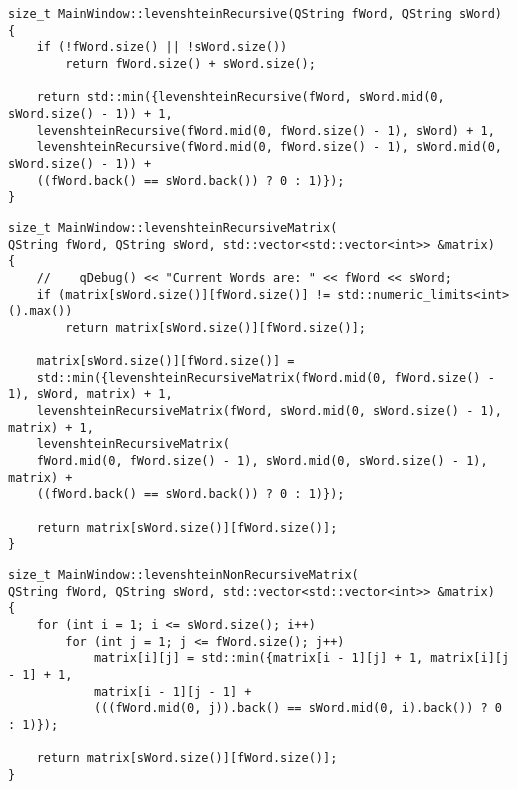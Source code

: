 \documentclass[12pt]{report}
\begin{document}
\begin{lstlisting}[label=some-code,caption=Функция реализации рекурсивного алгоритма Левенштейна]
size_t MainWindow::levenshteinRecursive(QString fWord, QString sWord)
{
    if (!fWord.size() || !sWord.size())
        return fWord.size() + sWord.size();

    return std::min({levenshteinRecursive(fWord, sWord.mid(0, sWord.size() - 1)) + 1,
    levenshteinRecursive(fWord.mid(0, fWord.size() - 1), sWord) + 1,
    levenshteinRecursive(fWord.mid(0, fWord.size() - 1), sWord.mid(0, sWord.size() - 1)) +
    ((fWord.back() == sWord.back()) ? 0 : 1)});
}
\end{lstlisting}

\begin{lstlisting}[label=some-code,caption=Функция реализации рекурсивного алгоритма Левенштейна с использованием матрицы расстояний]
size_t MainWindow::levenshteinRecursiveMatrix(
QString fWord, QString sWord, std::vector<std::vector<int>> &matrix)
{
    //    qDebug() << "Current Words are: " << fWord << sWord;
    if (matrix[sWord.size()][fWord.size()] != std::numeric_limits<int>().max())
        return matrix[sWord.size()][fWord.size()];

    matrix[sWord.size()][fWord.size()] =
    std::min({levenshteinRecursiveMatrix(fWord.mid(0, fWord.size() - 1), sWord, matrix) + 1,
    levenshteinRecursiveMatrix(fWord, sWord.mid(0, sWord.size() - 1), matrix) + 1,
    levenshteinRecursiveMatrix(
    fWord.mid(0, fWord.size() - 1), sWord.mid(0, sWord.size() - 1), matrix) +
    ((fWord.back() == sWord.back()) ? 0 : 1)});

    return matrix[sWord.size()][fWord.size()];
}
\end{lstlisting}

\begin{lstlisting}[label=some-code,caption=Функция реализации итеративного алгоритма Левенштейна]
size_t MainWindow::levenshteinNonRecursiveMatrix(
QString fWord, QString sWord, std::vector<std::vector<int>> &matrix)
{
    for (int i = 1; i <= sWord.size(); i++)
        for (int j = 1; j <= fWord.size(); j++)
            matrix[i][j] = std::min({matrix[i - 1][j] + 1, matrix[i][j - 1] + 1,
            matrix[i - 1][j - 1] +
            (((fWord.mid(0, j)).back() == sWord.mid(0, i).back()) ? 0 : 1)});

    return matrix[sWord.size()][fWord.size()];
}
\end{lstlisting}
\end{document}
